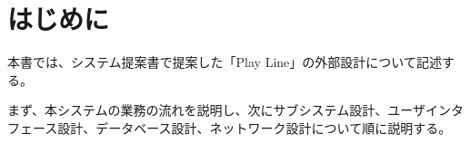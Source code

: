 \section{はじめに}

本書では、システム提案書で提案した「Play Line」の外部設計について記述する。 

まず、本システムの業務の流れを説明し、次にサブシステム設計、ユーザインタフェース設計、データベース設計、ネットワーク設計について順に説明する。 